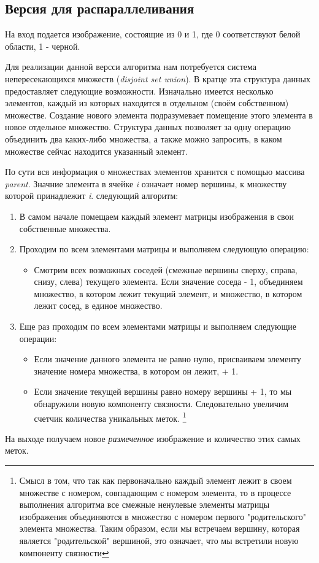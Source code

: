 \documentclass{report}
\begin{document}
\subsection*{Версия для распараллеливания}

\par На вход подается изображение, состоящие из 0 и 1, где 0 соответствуют белой области, 1 - черной.
\par Для реализации данной версси алгоритма нам потребуется система непересекающихся множеств (\textit{disjoint set union}). В кратце эта структура данных предоставляет следующие возможности. Изначально имеется несколько элементов, каждый из которых находится в отдельном (своём собственном) множестве. Создание нового элемента подразумевает помещение этого элемента в новое отдельное множество. Структура данных позволяет за одну операцию объединить два каких-либо множества, а также можно запросить, в каком множестве сейчас находится указанный элемент. 
\par По сути вся информация о множествах элементов хранится с помощью массива \textit{parent}. Значние элемента в ячейке \textit{i} означает номер вершины, к множеству которой принадлежит \textit{i}.
 следующий алгоритм:
\begin{enumerate}
    \item В самом начале помещаем каждый элемент матрицы изображения в свои собственные множества. 
    \item Проходим по всем элементами матрицы и выполняем следующую операцию:
    \begin{itemize}
        \item Смотрим всех возможных соседей (смежные вершины сверху, справа, снизу, слева) текущего элемента. Если значение соседа - 1, объединяем множество, в котором лежит текущий элемент, и множество, в котором лежит сосед, в единое множество.
    \end{itemize}
    \item Еще раз проходим по всем элементами матрицы и выполняем следующие операции:
    \begin{itemize}
        \item Если значение данного элемента не равно нулю, присваиваем элементу значение номера множества, в котором он лежит, + 1.
        \item Если значение текущей вершины равно номеру вершины + 1, то мы обнаружили новую компоненту связности. Следовательно увеличим счетчик количества уникальных меток. 
        \footnote{Смысл в том, что так как первоначально каждый элемент лежит в своем множестве с номером, совпадающим с номером элемента, то в процессе выполнения алгоритма все смежные ненулевые элементы матрицы изображения объединяются в множество с номером первого "родительского" элемента множества. Таким образом, если мы встречаем вершину, которая является "родительской" вершиной, это означает, что мы встретили новую компоненту связности }
    \end{itemize}
\end{enumerate}
\par На выходе получаем новое \textit{размеченное} изображение и количество этих самых меток.
\end{document}

